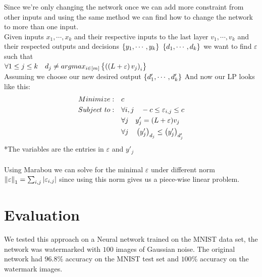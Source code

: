 \documentclass[a4paper]{llncs}
\newcommand{\guy}[1]{\marginpar{\textcolor{orange}{Guy: #1}}}
\begin{document}
Since we're only changing the network once we can add more constraint from other inputs and using the same method we can find how to change the network to more than one input.\\
Given inputs $x_1,\cdots,x_k$ and their respective inputs to the last layer $v_1,\cdots,v_k$ and their respected outputs and decisions $\bracketsC{y_1,\cdots,y_k}\ \bracketsC{d_1,\cdots,d_k}$ we want to find $\varepsilon$ such that\\
$\forall 1\leq j\leq k\quad d_j \neq argmax_{i\in\left[m\right]}\left\lbrace \left(\left(L+\varepsilon\right)v_j\right)_i\right\rbrace$\\
Assuming we choose our new desired output
$\left\lbrace d'_1,\cdots,d'_k\right\rbrace$
And now our LP looks like this:\\
\begin{align*}
    Minimize:\quad & c \\
    Subject\ to:\quad & \forall i,j\quad -c \leq\varepsilon_{i,j}\leq c\\
    & \forall j\quad y'_j=(L+\varepsilon)v_j \\
    & \forall j\quad \left(y'_j\right)_{d_j} \leq \left(y'_j\right)_{d'_j}\\
\end{align*}
\hspace*{5cm} *The variables are the entries in $\varepsilon$ and
$y'_j$
\\\\
Using Marabou\cite{KaHuIbJuLaLiShThWuZeDiKoBa19Marabou} we can solve for the minimal $\varepsilon$ under different norm
$\left\lVert\varepsilon\right\rVert_1=\sum_{i,j}\left\lvert\varepsilon_{i,j}\right\rvert$ since using
this norm gives us a piece-wise linear problem.

\guy{Overall, this looks good. Some stuff will need to be moved to other
sections according to the paper layout.}

\section{Evaluation}
\label{sec:evaluation}
We tested this approach on a Neural network trained on the MNIST data set, the network was watermarked with $100$ images of Gaussian noise. The original network had $96.8\text{\%}$ accuracy on the MNIST test set and $100\text{\%}$ accuracy on the watermark images.
\end{document}
